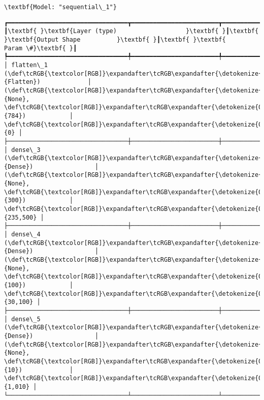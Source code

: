 \documentclass[12pt letter]{report}
\begin{document}
    
    \begin{Verbatim}[commandchars=\\\{\}]
\textbf{Model: "sequential\_1"}

    \end{Verbatim}

    
    
    \begin{Verbatim}[commandchars=\\\{\}]
┏━━━━━━━━━━━━━━━━━━━━━━━━━━━━━━━━━┳━━━━━━━━━━━━━━━━━━━━━━━━┳━━━━━━━━━━━━━━━┓
┃\textbf{ }\textbf{Layer (type)                   }\textbf{ }┃\textbf{ }\textbf{Output Shape          }\textbf{ }┃\textbf{ }\textbf{      Param \#}\textbf{ }┃
┡━━━━━━━━━━━━━━━━━━━━━━━━━━━━━━━━━╇━━━━━━━━━━━━━━━━━━━━━━━━╇━━━━━━━━━━━━━━━┩
│ flatten\_1 (\def\tcRGB{\textcolor[RGB]}\expandafter\tcRGB\expandafter{\detokenize{0,135,255}}{Flatten})             │ (\def\tcRGB{\textcolor[RGB]}\expandafter\tcRGB\expandafter{\detokenize{0,215,255}}{None}, \def\tcRGB{\textcolor[RGB]}\expandafter\tcRGB\expandafter{\detokenize{0,175,0}}{784})            │             \def\tcRGB{\textcolor[RGB]}\expandafter\tcRGB\expandafter{\detokenize{0,175,0}}{0} │
├─────────────────────────────────┼────────────────────────┼───────────────┤
│ dense\_3 (\def\tcRGB{\textcolor[RGB]}\expandafter\tcRGB\expandafter{\detokenize{0,135,255}}{Dense})                 │ (\def\tcRGB{\textcolor[RGB]}\expandafter\tcRGB\expandafter{\detokenize{0,215,255}}{None}, \def\tcRGB{\textcolor[RGB]}\expandafter\tcRGB\expandafter{\detokenize{0,175,0}}{300})            │       \def\tcRGB{\textcolor[RGB]}\expandafter\tcRGB\expandafter{\detokenize{0,175,0}}{235,500} │
├─────────────────────────────────┼────────────────────────┼───────────────┤
│ dense\_4 (\def\tcRGB{\textcolor[RGB]}\expandafter\tcRGB\expandafter{\detokenize{0,135,255}}{Dense})                 │ (\def\tcRGB{\textcolor[RGB]}\expandafter\tcRGB\expandafter{\detokenize{0,215,255}}{None}, \def\tcRGB{\textcolor[RGB]}\expandafter\tcRGB\expandafter{\detokenize{0,175,0}}{100})            │        \def\tcRGB{\textcolor[RGB]}\expandafter\tcRGB\expandafter{\detokenize{0,175,0}}{30,100} │
├─────────────────────────────────┼────────────────────────┼───────────────┤
│ dense\_5 (\def\tcRGB{\textcolor[RGB]}\expandafter\tcRGB\expandafter{\detokenize{0,135,255}}{Dense})                 │ (\def\tcRGB{\textcolor[RGB]}\expandafter\tcRGB\expandafter{\detokenize{0,215,255}}{None}, \def\tcRGB{\textcolor[RGB]}\expandafter\tcRGB\expandafter{\detokenize{0,175,0}}{10})             │         \def\tcRGB{\textcolor[RGB]}\expandafter\tcRGB\expandafter{\detokenize{0,175,0}}{1,010} │
└─────────────────────────────────┴────────────────────────┴───────────────┘

    \end{Verbatim}
\end{document}
